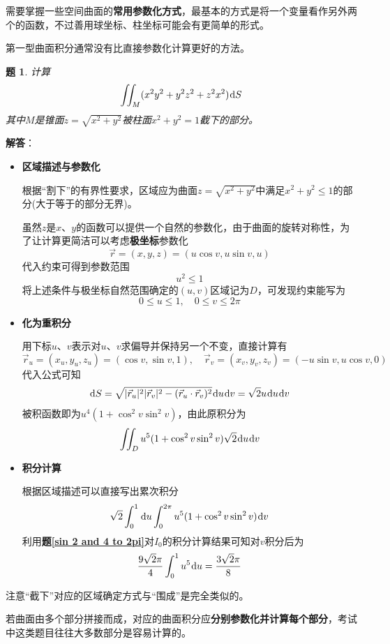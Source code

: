 \documentclass[a4paper,UTF8,fontset=windows,AutoFakeBold]{ctexart}
\newcommand*{\dr}{\hspace{0.07em}\mathrm{d}}
\newcommand*{\rv}{\vec{r}}
\newcommand*{\note}{\noindent *}
\theoremstyle{ex}
\newtheorem{exercise}{题}
\newcommand{\exref}[1]{\textbf{题\;\ref{#1}\;}}
\newcommand{\sol}[1]{{\vspace{5pt}\kaishu\noindent\textbf{解答}：\vspace{-3pt}
\begin{compactitem}
    \item[] #1
\end{compactitem}
}}
\begin{document}
\note 需要掌握一些空间曲面的\textbf{常用参数化方式}，最基本的方式是将一个变量看作另外两个的函数，不过善用球坐标、柱坐标可能会有更简单的形式。

\note 第一型曲面积分通常没有比直接参数化计算更好的方法。

\begin{framed}
\begin{exercise}
    计算
    $$\iint_M(x^2y^2+y^2z^2+z^2x^2)\dr S$$
    其中$M$是锥面$z=\sqrt{x^2+y^2}$被柱面$x^2+y^2=1$截下的部分。
\end{exercise}
\sol{
    \begin{itemize}
        \item \textbf{区域描述与参数化}
            
        根据``割下''的有界性要求，区域应为曲面$z=\sqrt{x^2+y^2}$中满足$x^2+y^2\le1$的部分(大于等于的部分无界)。

        虽然$z$是$x$、$y$的函数可以提供一个自然的参数化，由于曲面的旋转对称性，为了让计算更简洁可以考虑\textbf{极坐标}参数化
        $$\rv=(x,y,z)=(u\cos v,u\sin v,u)$$
        代入约束可得到参数范围
        $$u^2\le1$$
        将上述条件与极坐标自然范围确定的$(u,v)$区域记为$D$，可发现约束能写为
        $$0\le u\le1,\quad0\le v\le2\pi$$

        \item \textbf{化为重积分}
        
        用下标$u$、$v$表示对$u$、$v$求偏导并保持另一个不变，直接计算有
        $$\rv_u=(x_u,y_u,z_u)=(\cos v,\sin v,1),\quad\rv_v=(x_v,y_v,z_v)=(-u\sin v,u\cos v,0)$$
        代入公式可知
        $$\dr S=\sqrt{|\rv_u|^2|\rv_v|^2-(\rv_u\cdot\rv_v)^2}\dr u\dr v=\sqrt2u\dr u\dr v$$
        被积函数即为$u^4(1+\cos^2v\sin^2v)$，由此原积分为
        $$\iint_Du^5(1+\cos^2v\sin^2v)\sqrt2\dr u\dr v$$

        \item \textbf{积分计算}
        
        根据区域描述可以直接写出累次积分
        $$\sqrt2\int_0^1\dr u\int_0^{2\pi}u^5(1+\cos^2v\sin^2v)\dr v$$
        利用\exref{sin 2 and 4 to 2pi}对$I_0$的积分计算结果可知对$v$积分后为
        $$\frac{9\sqrt2\pi}{4}\int_0^1u^5\dr u=\frac{3\sqrt2\pi}{8}$$
    \end{itemize}
}
\end{framed}

\note 注意``截下''对应的区域确定方式与``围成''是完全类似的。

\note 若曲面由多个部分拼接而成，对应的曲面积分应\textbf{分别参数化并计算每个部分}，考试中这类题目往往大多数部分是容易计算的。
\end{document}
